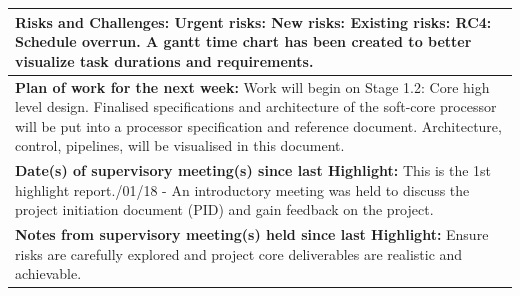 \documentclass[11pt,a4paper]{article}
\begin{document}
\begin{table}[H]
\begin{tabularx}{\textwidth}{|X|}
	\\ \hline
	\textbf{Risks and Challenges:}\newline
	{\color{red} Urgent risks:}\newline
	{\color{orange} New risks:}\newline
	{\color{purple} Existing risks:\newline
	RC4: Schedule overrun. A gantt time chart has been created to better visualize task durations and requirements.}\newline
	\\ \hline
	\textbf{Plan of work for the next week:}\newline
	Work will begin on Stage 1.2: Core high level design.\newline\newline
	Finalised specifications and architecture of the soft-core processor will be put into a processor specification and reference document.
	\newline
	Architecture, control, pipelines, will be visualised in this document.
	
	\\ \hline
	\textbf{Date(s) of supervisory meeting(s) since last Highlight:}\newline
	This is the 1st highlight report.\newline
	30/01/18 - An introductory meeting was held to discuss the project initiation document (PID) and gain feedback on the project.
	\\ \hline
	\textbf{Notes from supervisory meeting(s) held since last Highlight:}\newline
	Ensure risks are carefully explored and project core deliverables are realistic and achievable.
	\\ \hline
    \end{tabularx}
\end{table}
\end{document}
